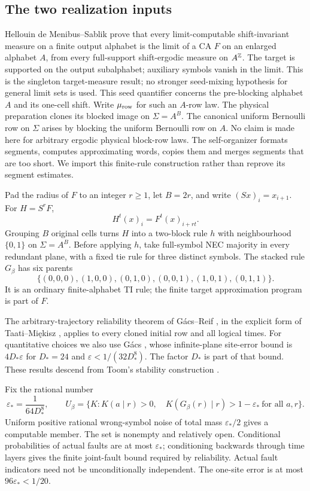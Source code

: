 \subsection{The two realization inputs}
Hellouin de Menibus--Sablik \cite[Corollary~1]{hdms} prove that
every limit-computable shift-invariant measure on a finite output
alphabet is the limit of a CA $F$ on an enlarged alphabet $A$,
from every full-support shift-ergodic measure on $A^\mathbb Z$.
The target is supported on the output subalphabet; auxiliary symbols
vanish in the limit. This is the singleton target-measure result;
no stronger seed-mixing hypothesis for general limit sets is used.
This seed quantifier concerns the pre-blocking alphabet $A$
and its one-cell shift. Write $\mu_{\rm row}$ for such an $A$-row
law. The physical preparation clones its blocked image on
$\Sigma=A^B$. The canonical uniform Bernoulli row on $\Sigma$
arises by blocking the uniform Bernoulli row on $A$.
No claim is made here for arbitrary ergodic physical block-row laws.
The self-organizer formats segments, computes approximating words,
copies them and merges segments that are too short. We import this
finite-rule construction rather than reprove its segment estimates.

Pad the radius of $F$ to an integer $r\geq1$, let $B=2r$, and
write $(Sx)_i=x_{i+1}$. For $H=S^rF$,
\begin{equation}\label{eq:blockdrift}
 H^t(x)_i=F^t(x)_{i+rt}.
\end{equation}
Grouping $B$ original cells turns $H$ into a two-block rule $h$
with neighbourhood $\{0,1\}$ on $\Sigma=A^B$. Before applying
$h$, take full-symbol NEC majority in every redundant plane, with
a fixed tie rule for three distinct symbols. The stacked rule
$G_\beta$ has six parents
\[
 \{(0,0,0),(1,0,0),(0,1,0),
                 (0,0,1),(1,0,1),(0,1,1)\}.
\]
It is an ordinary finite-alphabet TI rule; the finite target
approximation program is part of $F$.

The arbitrary-trajectory reliability theorem of G\'acs--Reif
\cite{gacsreif}, in the explicit form of Taati--Mi\k{e}kisz
\cite[Theorem~3.1]{miekisztaati}, applies to every cloned initial
row and all logical times. For quantitative choices we also use
G\'acs \cite[Theorem~1]{gacstoom}, whose infinite-plane site-error
bound is $4D_*\varepsilon$ for
$D_*=24$ and $\varepsilon<1/(32D_*^8)$. The factor $D_*$
is part of that bound. These results descend from Toom's
stability construction \cite{toom}.

Fix the rational number
\begin{equation}\label{eq:epsilon}
 \varepsilon_*=\frac1{64D_*^8},\qquad
 U_\beta=\{K:K(a\mid r)>0,\quad
          K(G_\beta(r)\mid r)>1-\varepsilon_*\ \text{for all }a,r\}.
\end{equation}
Uniform positive rational wrong-symbol noise of total mass
$\varepsilon_*/2$ gives a computable member. The set is nonempty
and relatively open. Conditional probabilities of actual faults
are at most $\varepsilon_*$; conditioning backwards through time
layers gives the finite joint-fault bound required by reliability.
Actual fault indicators need not be unconditionally independent.
The one-site error is at most $96\varepsilon_*<1/20$.

